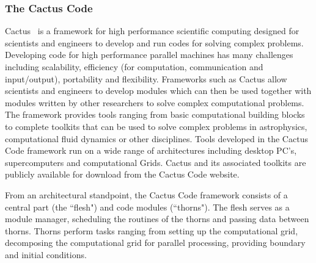 \documentclass[conference,final]{IEEEtran}
\begin{document}
\subsubsection{The Cactus Code~\cite{cactus_web}}

Cactus~\cite{X0} is a framework for high performance scientific
computing designed for scientists and engineers to develop and run
codes for solving complex problems.  Developing code for high
performance parallel machines has many challenges including
scalability, efficiency (for computation, communication and
input/output), portability and flexibility. Frameworks such as Cactus
allow scientists and engineers to develop modules which can then be
used together with modules written by other researchers to solve
complex computational problems. The framework provides tools ranging
from basic computational building blocks to complete toolkits that can
be used to solve complex problems in astrophysics, computational fluid
dynamics or other disciplines.  Tools developed in the Cactus Code
framework run on a wide range of architectures including desktop PC's,
supercomputers and computational Grids. Cactus and its associated
toolkits are publicly available for download from the Cactus Code
website.

From an architectural standpoint, the Cactus Code framework consists
of a central part (the ``flesh") and code modules (``thorns").  The
flesh serves as a module manager, scheduling the routines of the
thorns and passing data between thorns.  Thorns perform tasks ranging
from setting up the computational grid, decomposing the computational
grid for parallel processing, providing boundary and initial
conditions.
%
\end{document}
